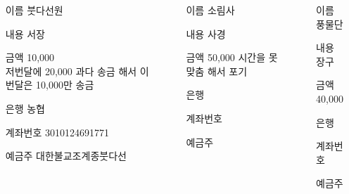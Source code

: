 \documentclass[	25pt, 
							a0paper, 
							portrait, %
							margin=0mm, %
							innermargin=10mm,  		%
							blockverticalspace=4mm, %
							colspace=5mm, 
							subcolspace=0mm
							]{tikzposter}
\begin{document}
\begin{columns}
		{
			\setlength{\leftmargini}{7em}			
			\setlength{\labelsep}{1em} %
			\begin{LARGE}
			\begin{itemize}
			\item [이름] 붓다선원
			\item [내용] 서장 
			\item [금액] 10,000 \\ 저번달에 20,000 과다 송금 해서 이번달은 10,000만 송금
			\item [은행] 		농협
			\item [계좌번호] 	3010124691771
			\item [예금주] 	 대한불교조계종붓다선
			\end{itemize}
			\end{LARGE}

		}


		{
			\setlength{\leftmargini}{7em}			
			\setlength{\labelsep}{1em} %
			\begin{LARGE}
			\begin{itemize}
			\item [이름] 소림사
			\item [내용] 사경
			\item [금액] 50,000 시간을 못 맞춤 해서 포기 
			\item [은행] 
			\item [계좌번호] 
			\item [예금주] 
			\end{itemize}
			\end{LARGE}
		}		




		{
			\setlength{\leftmargini}{7em}			
			\setlength{\labelsep}{1em} %
			\begin{LARGE}
			\begin{itemize}
			\item [이름] 풍물단
			\item [내용] 장구
			\item [금액] 40,000
			\item [은행] 
			\item [계좌번호] 
			\item [예금주] 
			\end{itemize}
			\end{LARGE}
		}		


\end{columns}
\end{document}
